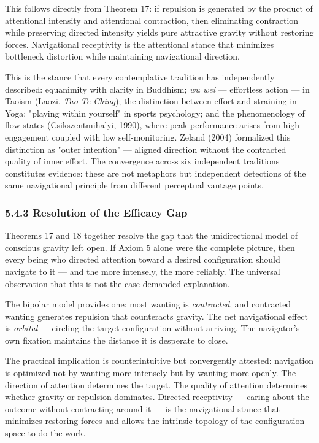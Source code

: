 This follows directly from Theorem 17: if repulsion is generated by the product of attentional intensity and attentional contraction, then eliminating contraction while preserving directed intensity yields pure attractive gravity without restoring forces. Navigational receptivity is the attentional stance that minimizes bottleneck distortion while maintaining navigational direction.


This is the stance that every contemplative tradition has independently described: equanimity with clarity in Buddhism; \textit{wu wei} — effortless action — in Taoism (Laozi, \textit{Tao Te Ching}); the distinction between effort and straining in Yoga; "playing within yourself" in sports psychology; and the phenomenology of flow states (Csikszentmihalyi, 1990), where peak performance arises from high engagement coupled with low self-monitoring. Zeland (2004) formalized this distinction as "outer intention" — aligned direction without the contracted quality of inner effort. The convergence across six independent traditions constitutes evidence: these are not metaphors but independent detections of the same navigational principle from different perceptual vantage points.


\subsubsection*{5.4.3 Resolution of the Efficacy Gap}


Theorems 17 and 18 together resolve the gap that the unidirectional model of conscious gravity left open. If Axiom 5 alone were the complete picture, then every being who directed attention toward a desired configuration should navigate to it — and the more intensely, the more reliably. The universal observation that this is not the case demanded explanation.


The bipolar model provides one: most wanting is \textit{contracted}, and contracted wanting generates repulsion that counteracts gravity. The net navigational effect is \textit{orbital} — circling the target configuration without arriving. The navigator's own fixation maintains the distance it is desperate to close.


The practical implication is counterintuitive but convergently attested: navigation is optimized not by wanting more intensely but by wanting more openly. The direction of attention determines the target. The quality of attention determines whether gravity or repulsion dominates. Directed receptivity — caring about the outcome without contracting around it — is the navigational stance that minimizes restoring forces and allows the intrinsic topology of the configuration space to do the work.


